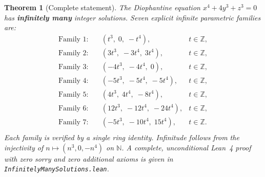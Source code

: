 \documentclass[12pt,a4paper]{article}
\newtheorem{theorem}{Theorem}[section]
\theoremstyle{definition}
\newcommand{\Z}{\mathbb{Z}}
\newcommand{\N}{\mathbb{N}}
\begin{document}
\begin{theorem}[Complete statement]
  The Diophantine equation $x^4 + 4y^3 + z^3 = 0$ has \textbf{infinitely many}
  integer solutions.  Seven explicit infinite parametric families are:
  \begin{align*}
    \text{Family 1:} &\quad (t^3,\; 0,\; -t^4), & t \in \Z, \\
    \text{Family 2:} &\quad (3t^3,\; -3t^4,\; 3t^4), & t \in \Z, \\
    \text{Family 3:} &\quad (-4t^3,\; -4t^4,\; 0), & t \in \Z, \\
    \text{Family 4:} &\quad (-5t^3,\; -5t^4,\; -5t^4), & t \in \Z, \\
    \text{Family 5:} &\quad (4t^3,\; 4t^4,\; -8t^4), & t \in \Z, \\
    \text{Family 6:} &\quad (12t^3,\; -12t^4,\; -24t^4), & t \in \Z, \\
    \text{Family 7:} &\quad (-5t^3,\; -10t^4,\; 15t^4), & t \in \Z. \\
  \end{align*}
  Each family is verified by a single ring identity.  Infinitude follows from
  the injectivity of $n \mapsto (n^3, 0, -n^4)$ on $\N$.
  A complete, unconditional Lean~4 proof with zero sorry and zero additional axioms
  is given in \texttt{InfinitelyManySolutions.lean}.
\end{theorem}
\end{document}
